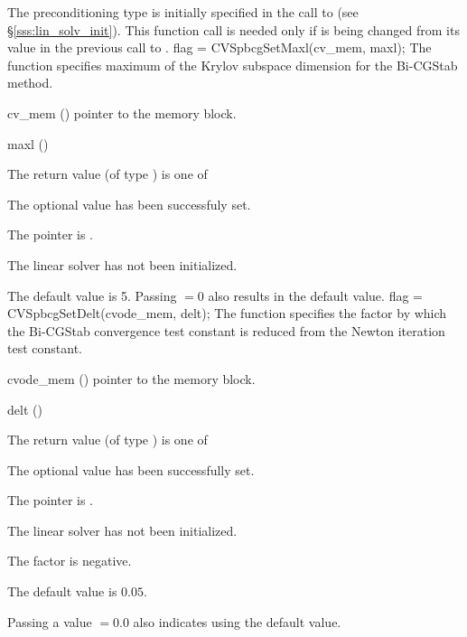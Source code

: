 {
  The preconditioning type is initially specified in the call
  to  (see \S\ref{sss:lin_solv_init}). This function call is
  needed only if  is being changed from its value in the
  previous call to .
}
{
  flag = CVSpbcgSetMaxl(cv\_mem, maxl);
}
{
  The function  specifies maximum of the Krylov subspace
  dimension for the Bi-CGStab method.
}
{
  \begin{args}[cv\_mem]
  \item[cv\_mem] ()
    pointer to the {\cvode} memory block.
  \item[maxl] ()

  \end{args}
}
{
  The return value  (of type ) is one of
  \begin{args}
  \item[\Id{CVSPBCG\_SUCCESS}] 
    The optional value has been successfuly set.
  \item[\Id{CVSPBCG\_MEM\_NULL}]
    The  pointer is .
  \item[\Id{CVSPBCG\_LMEM\_NULL}]
    The {\cvspbcg} linear solver has not been initialized.
  \end{args}
}
{
  The default value is 5.  Passing  $= 0$ also results in the
  default value. 
}
{
  flag = CVSpbcgSetDelt(cvode\_mem, delt);
}
{
  The function  specifies the factor by which the
  Bi-CGStab convergence test constant is reduced
  from the Newton iteration test constant.
}
{
  \begin{args}
  \item[cvode\_mem] ()
    pointer to the {\cvode} memory block.
  \item[delt] ()

  \end{args}
}
{
  The return value  (of type ) is one of
  \begin{args}
  \item[\Id{CVSPBCG\_SUCCESS}] 
    The optional value has been successfully set.
  \item[\Id{CVSPBCG\_MEM\_NULL}]
    The  pointer is .
  \item[\Id{CVSPBCG\_LMEM\_NULL}]
    The {\cvspbcg} linear solver has not been initialized.
  \item[\Id{CVSPBCG\_ILL\_INPUT}]
    The factor  is negative.  
  \end{args}
}
{
  The default value is $0.05$.

  Passing a value $ = 0.0$ also indicates using the default value.
}

